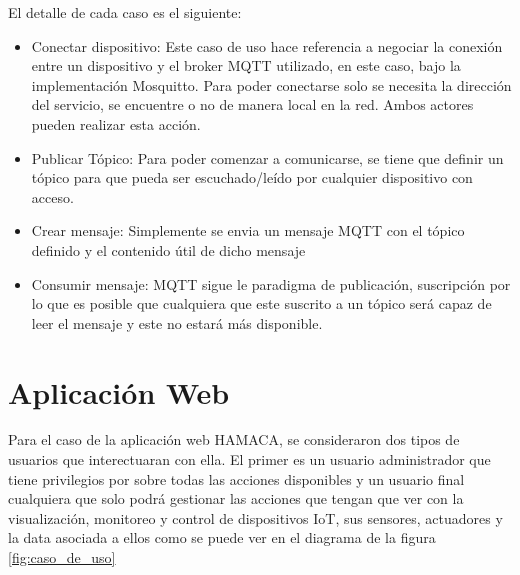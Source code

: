 El detalle de cada caso es el siguiente:
\begin{itemize}
\item Conectar dispositivo: Este caso de uso hace referencia a negociar la conexión entre un dispositivo y el broker MQTT utilizado, en este caso, bajo la implementación Mosquitto. Para poder conectarse solo se necesita la dirección del servicio, se encuentre o no de manera local en la red. Ambos actores pueden realizar esta acción.
\item Publicar Tópico: Para poder comenzar a comunicarse, se tiene que definir un tópico para que pueda ser escuchado/leído por cualquier dispositivo con acceso. 
\item Crear mensaje: Simplemente se envia un mensaje MQTT con el tópico definido y el contenido útil de dicho mensaje
\item Consumir mensaje: MQTT sigue le paradigma de publicación, suscripción por lo que es posible que cualquiera que este suscrito a un tópico será capaz de leer el mensaje y este no estará más disponible. 
\end{itemize}

\section{Aplicación Web}
Para el caso de la aplicación web HAMACA, se consideraron dos tipos de usuarios que interectuaran con ella. El primer es un usuario administrador que tiene privilegios por sobre todas las acciones disponibles y un usuario final cualquiera que solo podrá gestionar las acciones que tengan que ver con la visualización, monitoreo y control de dispositivos IoT, sus sensores, actuadores y la data asociada a ellos como se puede ver en el diagrama de la figura \ref{fig:caso_de_uso}\\

